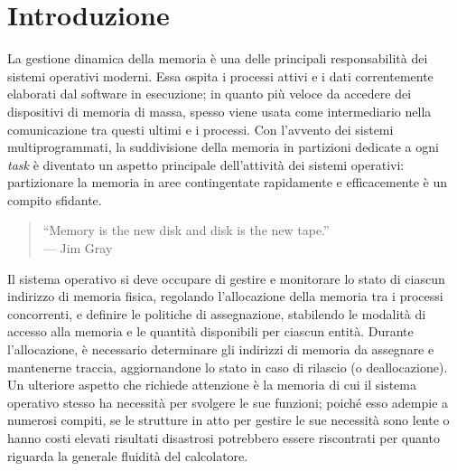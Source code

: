 \chapter{Introduzione}

La gestione dinamica della memoria è una delle principali responsabilità dei sistemi operativi moderni\footnotemark. Essa ospita i processi attivi e i dati correntemente elaborati dal software in esecuzione; in quanto più veloce da accedere dei dispositivi di memoria di massa, spesso viene usata come intermediario nella comunicazione tra questi ultimi e i processi. Con l'avvento dei sistemi multiprogrammati, la suddivisione della memoria in partizioni dedicate a ogni \textit{task} è diventato un aspetto principale dell'attività dei sistemi operativi: partizionare la memoria in aree contingentate rapidamente e efficacemente è un compito sfidante. 

\begin{quote}
“Memory is the new disk and disk is the new tape.”\\
\hfill --- Jim Gray
\end{quote}


Il sistema operativo si deve occupare di gestire e monitorare lo stato di ciascun indirizzo di memoria fisica, regolando l'allocazione della memoria tra i processi concorrenti, e definire le politiche di assegnazione, stabilendo le modalità di accesso alla memoria e le quantità disponibili per ciascun entità. Durante l'allocazione, è necessario determinare gli indirizzi di memoria da assegnare e mantenerne traccia, aggiornandone lo stato in caso di rilascio (o deallocazione). Un ulteriore aspetto che richiede attenzione è la memoria di cui il sistema operativo stesso ha necessità per svolgere le sue funzioni; poiché esso adempie a numerosi compiti, se le strutture in atto per gestire le sue necessità sono lente o hanno costi elevati risultati disastrosi potrebbero essere riscontrati per quanto riguarda la generale fluidità del calcolatore.

